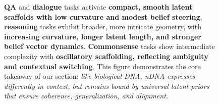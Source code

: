 \begin{figure}[t]
{    \textbf{QA} and \textbf{dialogue} tasks activate \textbf{compact, smooth latent scaffolds with low curvature and modest belief steering}; \textbf{reasoning} tasks exhibit broader, more intricate geometry, with \textbf{increasing curvature, longer latent length, and stronger belief vector dynamics}. 
    \textbf{Commonsense} tasks show intermediate complexity with \textbf{oscillatory scaffolding, reflecting ambiguity and contextual switching}. 
    This figure demonstrates the core takeaway of our section: 
    \emph{like biological DNA, nDNA expresses differently in context, but remains bound by universal latent priors that ensure coherence, generalization, and alignment.}
    }
  \label{fig:ndna_groups}
\end{figure}